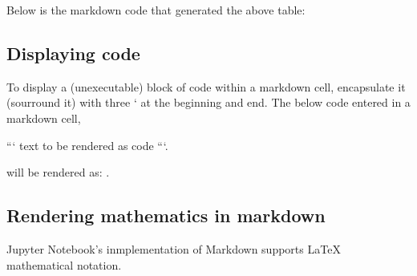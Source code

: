 \documentclass[letterpaper,10pt,english]{jupyterBook}
\begin{document}
\sphinxAtStartPar
Below is the markdown code that generated the above table:

\begin{sphinxVerbatim}[commandchars=\\\{\}]
                       
 \PYGZbs{}
 \PYGZbs{}
 \PYGZbs{}\PYGZbs{} \PYGZbs{}\PYGZbs{}      
 \PYGZbs{} \PYGZbs{}      
 \PYGZbs{}         

\end{sphinxVerbatim}


\subsection{Displaying code}
\label{\detokenize{content/04_PythonEssentials/Intro_Jupyter_notebook:displaying-code}}
\sphinxAtStartPar
To display a (unexecutable)  block of code within a markdown cell, encapsulate it (sourround it) with three ` at the beginning and end.  The below code entered in a markdown cell,

\sphinxAtStartPar
``` text to be rendered as code ```.

\sphinxAtStartPar
will be rendered as: .


\subsection{Rendering mathematics in markdown}
\label{\detokenize{content/04_PythonEssentials/Intro_Jupyter_notebook:rendering-mathematics-in-markdown}}
\sphinxAtStartPar
Jupyter Notebook’s inmplementation of Markdown supports LaTeX mathematical notation.
\end{document}
